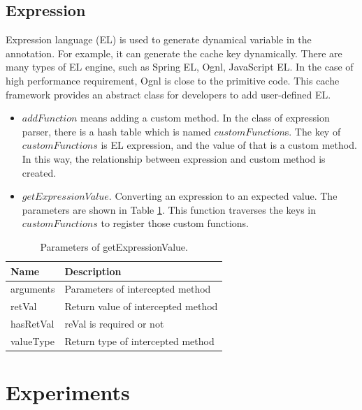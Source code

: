 \documentclass{singlecol-new}
\theoremstyle{TH}{
\newtheorem{lemma}{Lemma}
\newtheorem{theorem}[lemma]{Theorem}
\newtheorem{corrolary}[lemma]{Corrolary}
\newtheorem{conjecture}[lemma]{Conjecture}
\newtheorem{proposition}[lemma]{Proposition}
\newtheorem{claim}[lemma]{Claim}
\newtheorem{stheorem}[lemma]{Wrong Theorem}
}
\theoremstyle{THrm}{
\newtheorem{definition}{Definition}[section]
\newtheorem{question}{Question}[section]
\newtheorem{remark}{Remark}
\newtheorem{scheme}{Scheme}
}
\theoremstyle{THhit}{
\newtheorem{case}{Case}[section]
}
\begin{document}
\subsection{Expression}
Expression language (EL) is used to generate dynamical variable in the annotation. For example, it can generate the cache key dynamically. There are many types of EL engine, such as Spring EL, Ognl, JavaScript EL. In the case of high performance requirement, Ognl is close to the primitive code. This cache framework provides an abstract class for developers to add user-defined EL.

\begin{itemize}
  \item $addFunction$ means adding a custom method. In the class of expression parser, there is a hash table which is named $customFunction$s. The key of $customFunctions$ is EL expression, and the value of that is a custom method. In this way, the relationship between expression and custom method is created.
  \item $getExpressionValue$. Converting an expression to an expected value. The parameters are shown in Table \ref{getExpressionValue}. This function traverses the keys in $customFunctions$ to register those custom functions.
\end{itemize}

\begin{table}[htb]
\begin{center}
 \caption{\label{getExpressionValue}Parameters of getExpressionValue.}
 \begin{tabular}{ll}
 \toprule
Name & Description\\
 \midrule
arguments & Parameters of intercepted method\\
retVal & Return value of intercepted method\\
hasRetVal & reVal is required or not\\
valueType & Return type of intercepted method\\
\bottomrule
 \end{tabular}
\end{center}
\end{table}

\section{Experiments}
\label{Experiments}
\end{document}
